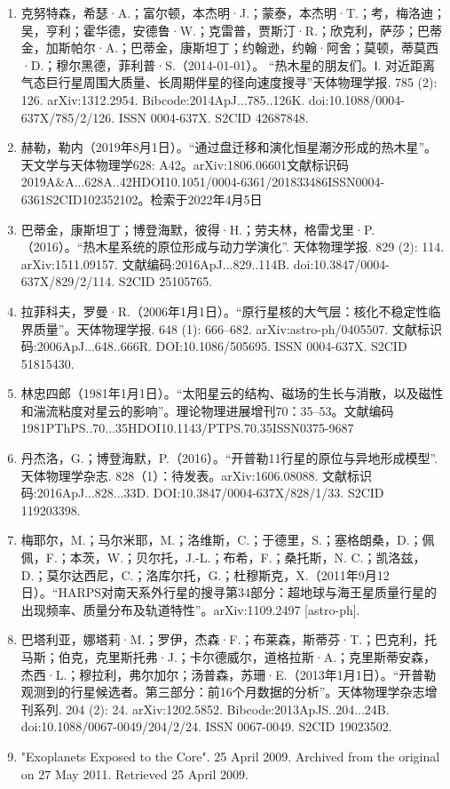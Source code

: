 \begin{enumerate}
\item 克努特森，希瑟·A.；富尔顿，本杰明·J.；蒙泰，本杰明·T.；考，梅洛迪；吴，亨利；霍华德，安德鲁·W.；克雷普，贾斯汀·R.；欣克利，萨莎；巴蒂金，加斯帕尔·A.；巴蒂金，康斯坦丁；约翰逊，约翰·阿舍；莫顿，蒂莫西·D.；穆尔黑德，菲利普·S.（2014-01-01）。 “热木星的朋友们。Ⅰ. 对近距离气态巨行星周围大质量、长周期伴星的径向速度搜寻”天体物理学报. 785 (2): 126. arXiv:1312.2954. Bibcode:2014ApJ...785..126K. doi:10.1088/0004-637X/785/2/126. ISSN 0004-637X. S2CID 42687848.
\item 赫勒，勒内（2019年8月1日）。“通过盘迁移和演化恒星潮汐形成的热木星”。天文学与天体物理学628: A42。arXiv:1806.06601文献标识码2019A&A...628A..42HDOI10.1051/0004-6361/201833486ISSN0004-6361S2CID102352102。检索于2022年4月5日
\item 巴蒂金，康斯坦丁；博登海默，彼得·H.；劳夫林，格雷戈里·P.（2016）。“热木星系统的原位形成与动力学演化”. 天体物理学报. 829 (2): 114. arXiv:1511.09157. 文献编码:2016ApJ...829..114B. doi:10.3847/0004-637X/829/2/114. S2CID 25105765.
\item 拉菲科夫，罗曼·R.（2006年1月1日）。“原行星核的大气层：核化不稳定性临界质量”。天体物理学报. 648 (1): 666–682. arXiv:astro-ph/0405507. 文献标识码:2006ApJ...648..666R. DOI:10.1086/505695. ISSN 0004-637X. S2CID 51815430.
\item 林忠四郎（1981年1月1日）。“太阳星云的结构、磁场的生长与消散，以及磁性和湍流粘度对星云的影响”。理论物理进展增刊70：35–53。文献编码1981PThPS..70...35HDOI10.1143/PTPS.70.35ISSN0375-9687
\item 丹杰洛，G.；博登海默，P.（2016）。“开普勒11行星的原位与异地形成模型”. 天体物理学杂志. 828（1）：待发表。arXiv:1606.08088. 文献标识码:2016ApJ...828...33D. DOI:10.3847/0004-637X/828/1/33. S2CID 119203398.
\item 梅耶尔，M.；马尔米耶，M.；洛维斯，C.；于德里，S.；塞格朗桑，D.；佩佩，F.；本茨，W.；贝尔托，J.-L.；布希，F.；桑托斯，N. C.；凯洛兹，D.；莫尔达西尼，C.；洛库尔托，G.；杜穆斯克，X.（2011年9月12日）。“HARPS对南天系外行星的搜寻第34部分：超地球与海王星质量行星的出现频率、质量分布及轨道特性”。arXiv:1109.2497 [astro-ph].
\item 巴塔利亚，娜塔莉·M.；罗伊，杰森·F.；布莱森，斯蒂芬·T.；巴克利，托马斯；伯克，克里斯托弗·J.；卡尔德威尔，道格拉斯·A.；克里斯蒂安森，杰西·L.；穆拉利，弗尔加尔；汤普森，苏珊·E.（2013年1月1日）。“开普勒观测到的行星候选者。第三部分：前16个月数据的分析”。天体物理学杂志增刊系列. 204 (2): 24. arXiv:1202.5852. Bibcode:2013ApJS..204...24B. doi:10.1088/0067-0049/204/2/24. ISSN 0067-0049. S2CID 19023502.
\item "Exoplanets Exposed to the Core". 25 April 2009. Archived from the original on 27 May 2011. Retrieved 25 April 2009.

\end{enumerate}

